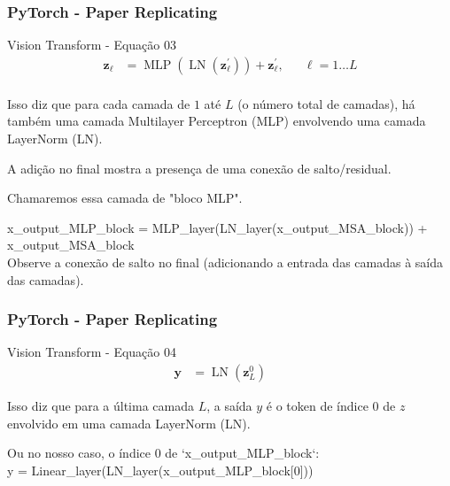 \documentclass{beamer}
\begin{document}
\begin{frame}
	\frametitle{PyTorch - Paper Replicating}
	\begin{block}{Vision Transform - Equação 03}
		$$
		\begin{aligned}
			\mathbf{z}_{\ell} &=\operatorname{MLP}\left(\operatorname{LN}\left(\mathbf{z}_{\ell}^{\prime}\right)\right)+\mathbf{z}_{\ell}^{\prime}, & & \ell=1 \ldots L \\
		\end{aligned}
		$$
		
		
		Isso diz que para cada camada de $1$ até $L$ (o número total de camadas), há também uma camada Multilayer Perceptron (MLP) envolvendo uma camada LayerNorm (LN).
		
		A adição no final mostra a presença de uma conexão de salto/residual.
		
		Chamaremos essa camada de "bloco MLP". 
		
		x\_output\_MLP\_block = MLP\_layer(LN\_layer(x\_output\_MSA\_block)) + x\_output\_MSA\_block
		\\ Observe a conexão de salto no final (adicionando a entrada das camadas à saída das camadas).
	\end{block}
\end{frame}
\begin{frame}
	\frametitle{PyTorch - Paper Replicating}
	\begin{block}{Vision Transform - Equação 04}
		$$
		\begin{aligned}
			\mathbf{y} &=\operatorname{LN}\left(\mathbf{z}_{L}^{0}\right) & &
		\end{aligned}
		$$
		
		Isso diz que para a última camada $L$, a saída $y$ é o token de índice 0 de $z$ envolvido em uma camada LayerNorm (LN).
		
		Ou no nosso caso, o índice 0 de `x\_output\_MLP\_block`: \\
		y = Linear\_layer(LN\_layer(x\_output\_MLP\_block[0]))
	\end{block}
\end{frame}
\end{document}
